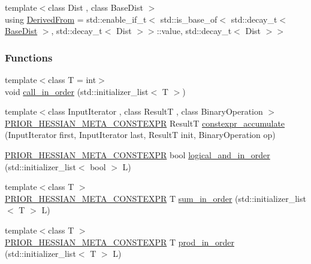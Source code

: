\begin{DoxyCompactItemize}
\item 
{\footnotesize template$<$class Dist , class Base\+Dist $>$ }\\using \hyperlink{namespaceprior__hessian_1_1meta_a7dcd55f8c696cfac1fe7872289c4d3e1}{Derived\+From} = std\+::enable\+\_\+if\+\_\+t$<$ std\+::is\+\_\+base\+\_\+of$<$ std\+::decay\+\_\+t$<$ \hyperlink{classprior__hessian_1_1BaseDist}{Base\+Dist} $>$, std\+::decay\+\_\+t$<$ Dist $>$$>$\+::value, std\+::decay\+\_\+t$<$ Dist $>$$>$
\end{DoxyCompactItemize}
\subsubsection*{Functions}
\begin{DoxyCompactItemize}
\item 
{\footnotesize template$<$class T  = int$>$ }\\void \hyperlink{namespaceprior__hessian_1_1meta_a179314ad7ba735849c4095e735374ab2}{call\+\_\+in\+\_\+order} (std\+::initializer\+\_\+list$<$ T $>$)
\item 
{\footnotesize template$<$class Input\+Iterator , class ResultT , class Binary\+Operation $>$ }\\\hyperlink{Meta_8h_a4f9105f0c435f5a50cc6000252e92575}{P\+R\+I\+O\+R\+\_\+\+H\+E\+S\+S\+I\+A\+N\+\_\+\+M\+E\+T\+A\+\_\+\+C\+O\+N\+S\+T\+E\+X\+PR} ResultT \hyperlink{namespaceprior__hessian_1_1meta_a8dd1d78533f7011bebda7009c0591041}{constexpr\+\_\+accumulate} (Input\+Iterator first, Input\+Iterator last, ResultT init, Binary\+Operation op)
\item 
\hyperlink{Meta_8h_a4f9105f0c435f5a50cc6000252e92575}{P\+R\+I\+O\+R\+\_\+\+H\+E\+S\+S\+I\+A\+N\+\_\+\+M\+E\+T\+A\+\_\+\+C\+O\+N\+S\+T\+E\+X\+PR} bool \hyperlink{namespaceprior__hessian_1_1meta_add11951e7edc2c231ca52c32ac0ee07b}{logical\+\_\+and\+\_\+in\+\_\+order} (std\+::initializer\+\_\+list$<$ bool $>$ L)
\item 
{\footnotesize template$<$class T $>$ }\\\hyperlink{Meta_8h_a4f9105f0c435f5a50cc6000252e92575}{P\+R\+I\+O\+R\+\_\+\+H\+E\+S\+S\+I\+A\+N\+\_\+\+M\+E\+T\+A\+\_\+\+C\+O\+N\+S\+T\+E\+X\+PR} T \hyperlink{namespaceprior__hessian_1_1meta_ab09470f06d05f5c58e249a03ef19242f}{sum\+\_\+in\+\_\+order} (std\+::initializer\+\_\+list$<$ T $>$ L)
\item 
{\footnotesize template$<$class T $>$ }\\\hyperlink{Meta_8h_a4f9105f0c435f5a50cc6000252e92575}{P\+R\+I\+O\+R\+\_\+\+H\+E\+S\+S\+I\+A\+N\+\_\+\+M\+E\+T\+A\+\_\+\+C\+O\+N\+S\+T\+E\+X\+PR} T \hyperlink{namespaceprior__hessian_1_1meta_a32068030d513a09bf78340f87be83639}{prod\+\_\+in\+\_\+order} (std\+::initializer\+\_\+list$<$ T $>$ L)
\end{DoxyCompactItemize}


